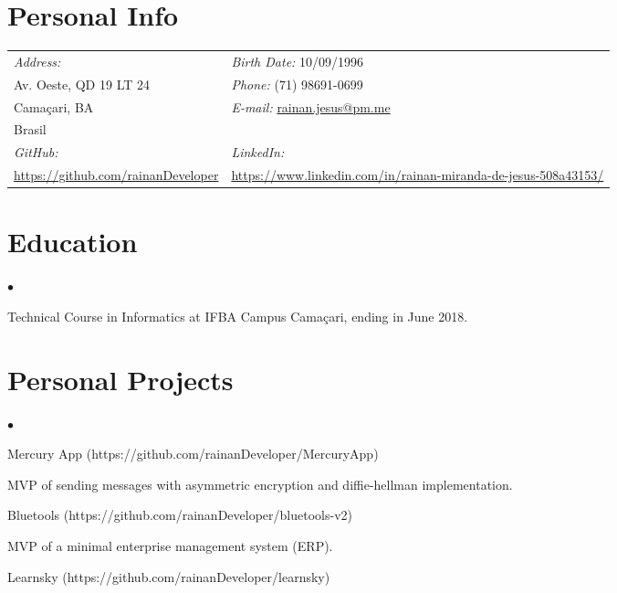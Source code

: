 \documentclass[margin,line]{res}
\newenvironment{list2}{
 \begin{list}{$\bullet$}{%
     \setlength{\itemsep}{0in}
     \setlength{\parsep}{0in} \setlength{\parskip}{0in}
     \setlength{\topsep}{0in} \setlength{\partopsep}{0in}
     \setlength{\leftmargin}{0.2in}}}{\end{list}}
\begin{document}
\vspace{0.2cm}
\begin{resume}
\section{Personal Info}
\vspace{.05in}
\begin{tabular}{@{}p{2.5in}p{3.5in}}
{\it Address: }                   & {\it Birth Date:}  10/09/1996 \\
Av. Oeste, QD 19 LT 24 & {\it Phone:}  (71) 98691-0699 \\
Camaçari, BA            & {\it E-mail:}  \href{mailto:rainan.jesus@pm.me}{rainan.jesus@pm.me}\\
Brasil                      & {\it }\\
{\it GitHub:}  & {\it LinkedIn:} \\
\href{https://github.com/rainanDeveloper}{https://github.com/rainanDeveloper} & \href{https://www.linkedin.com/in/rainan-miranda-de-jesus-508a43153/}{https://www.linkedin.com/in/rainan-miranda-de-jesus-508a43153/}
\end{tabular}
\vspace{0.2cm}
\section{Education}
\begin{list2}

\item Technical Course in Informatics at IFBA Campus Camaçari, ending in June 2018.
\end{list2}
\section{Personal Projects}
\begin{list2}
\item Mercury App (https://github.com/rainanDeveloper/MercuryApp)

    MVP of sending messages with asymmetric encryption and diffie-hellman implementation.
\item Bluetools (https://github.com/rainanDeveloper/bluetools-v2)

    MVP of a minimal enterprise management system (ERP).
\item Learnsky (https://github.com/rainanDeveloper/learnsky)


\end{list2}
\end{resume}
\end{document}
